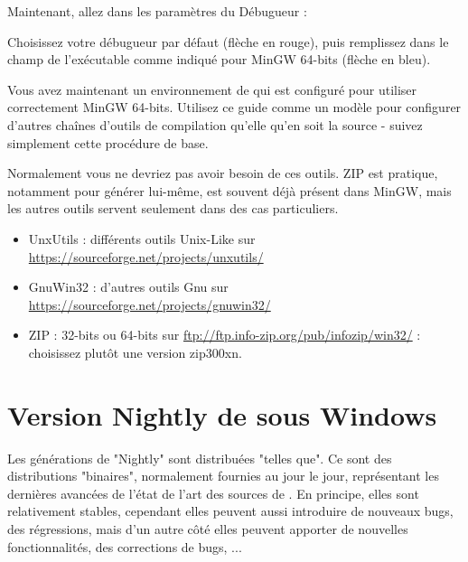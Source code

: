 
Maintenant, allez dans les paramètres du Débugueur :


Choisissez votre débugueur par défaut (flèche en rouge), puis remplissez dans le champ de l'exécutable comme indiqué pour MinGW 64-bits (flèche en bleu).



Vous avez maintenant un environnement de \codeblocks qui est configuré pour utiliser correctement MinGW 64-bits. Utilisez ce guide comme un modèle pour configurer d'autres chaînes d'outils de compilation qu'elle qu'en soit la source - suivez simplement cette procédure de base.

Normalement vous ne devriez pas avoir besoin de ces outils. ZIP est pratique, notamment pour générer \codeblocks lui-même, est souvent déjà présent dans MinGW, mais les autres outils servent seulement dans des cas particuliers.
\begin{itemize}
\item UnxUtils : différents outils Unix-Like sur \url{https://sourceforge.net/projects/unxutils/}
\item GnuWin32 : d'autres outils Gnu sur \url{https://sourceforge.net/projects/gnuwin32/}
\item ZIP : 32-bits ou 64-bits sur \url{ftp://ftp.info-zip.org/pub/infozip/win32/} : choisissez plutôt une version zip300xn.
\end{itemize}

\section{Version Nightly de \codeblocks sous Windows}

Les générations de "Nightly" sont distribuées "telles que". Ce sont des distributions "binaires", normalement fournies au jour le jour, représentant les dernières avancées de l'état de l'art des sources de \codeblocks. En principe, elles sont relativement stables, cependant elles peuvent aussi introduire de nouveaux bugs, des régressions, mais d'un autre côté elles peuvent apporter de nouvelles fonctionnalités, des corrections de bugs, ...

